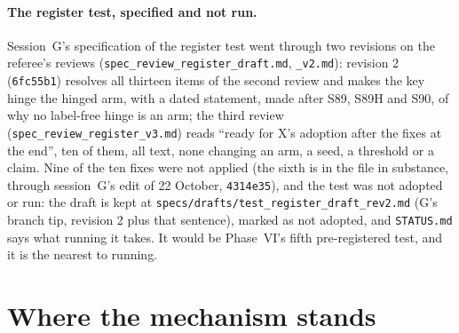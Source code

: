 \documentclass[11pt]{article}
\begin{document}
\paragraph{The register test, specified and not run.} Session~G's specification of the register test went through two revisions on the referee's reviews (\texttt{spec\_review\_register\_draft.md}, \texttt{\_v2.md}): revision 2 (\texttt{6fc55b1}) resolves all thirteen items of the second review and makes the key hinge the hinged arm, with a dated statement, made after S89, S89H and S90, of why no label-free hinge is an arm; the third review (\texttt{spec\_review\_register\_v3.md}) reads ``ready for X's adoption after the fixes at the end'', ten of them, all text, none changing an arm, a seed, a threshold or a claim. Nine of the ten fixes were not applied (the sixth is in the file in substance, through session~G's edit of 22 October, \texttt{4314e35}), and the test was not adopted or run: the draft is kept at \texttt{specs/drafts/test\_register\_draft\_rev2.md} (G's branch tip, revision 2 plus that sentence), marked as not adopted, and \texttt{STATUS.md} says what running it takes. It would be Phase~VI's fifth pre-registered test, and it is the nearest to running.

\section{Where the mechanism stands}
\label{sec:synthesis}
\end{document}
